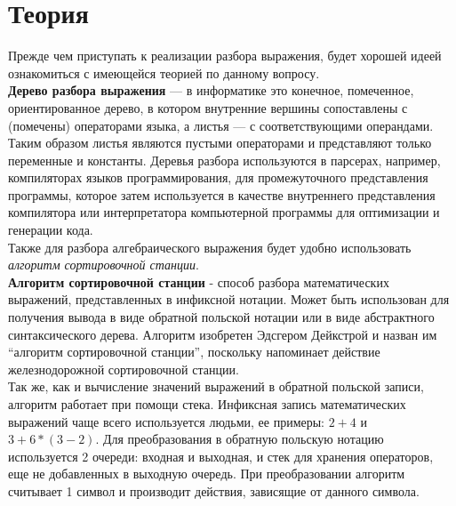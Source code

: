 \section{Теория}
\par
Прежде чем приступать к реализации разбора выражения, будет хорошей идеей
ознакомиться с имеющейся теорией по данному вопросу.\\
{\bf Дерево разбора выражения} — в информатике это конечное,
помеченное, ориентированное дерево, в котором внутренние вершины сопоставлены
с (помечены) операторами языка, а листья — с соответствующими
операндами. Таким образом листья являются пустыми операторами и представляют
только переменные и константы. Деревья разбора используются в парсерах,
например, компиляторах языков программирования,
для промежуточного представления программы, которое затем используется в
качестве внутреннего представления компилятора или интерпретатора компьютерной
программы для оптимизации и генерации кода.\\
Также для разбора алгебраического выражения будет удобно использовать {\it
алгоритм сортировочной станции}.\\
{\bf Алгоритм сортировочной станции} - способ разбора математических выражений,
представленных в инфиксной нотации. Может быть использован для получения
вывода в виде обратной польской нотации или в виде абстрактного
синтаксического дерева. Алгоритм изобретен Эдсгером Дейкстрой и назван им
``алгоритм сортировочной станции'', поскольку напоминает действие
железнодорожной сортировочной станции.\\
Так же, как и вычисление значений выражений в обратной польской записи,
алгоритм работает при помощи стека. Инфиксная запись математических выражений
чаще всего используется людьми, ее примеры: $2+4$ и $3+6*(3-2)$. Для
преобразования в обратную польскую нотацию используется 2 очереди: входная и
выходная, и стек для хранения операторов, еще не добавленных в выходную
очередь. При преобразовании алгоритм считывает 1 символ и производит действия,
зависящие от данного символа.
\pagebreak
